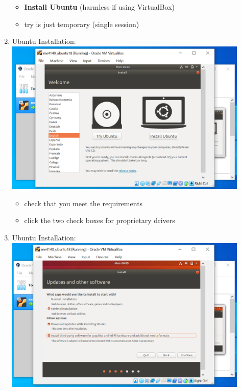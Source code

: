 \documentclass[12pt]{article}
\begin{document}
\begin{description}
\begin{enumerate}
\begin{itemize}
                 \item {\bf Install Ubuntu} (harmless if using VirtualBox)
                 \item try is just temporary (single session)
                   
            \end{itemize}

\item Ubuntu Installation: \vspace{5mm} \\
      		\hspace*{-2.5cm}\includegraphics[scale=.6]{Capture13.png} 
            \begin{itemize}
                    \item check that you meet the requirements
                 \item click the two check boxes for proprietary drivers
            \end{itemize}
	\newpage
\item Ubuntu Installation: \vspace{5mm} \\
      		\hspace*{-2.5cm}\includegraphics[scale=.6]{Capture15.png}\\
             \begin{itemize}
                    

\end{itemize}
\end{enumerate}
\end{description}
\end{document}
